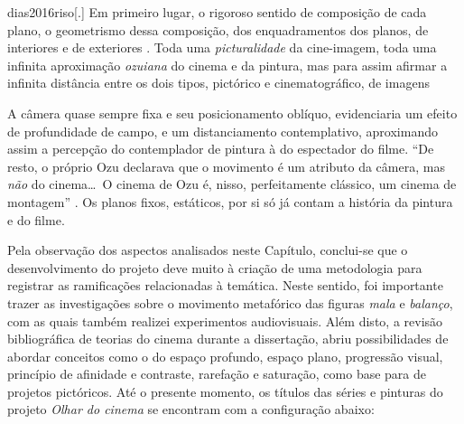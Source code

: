 \begin{displaycquote}[136-137]{dias2016riso}[.]
	Em primeiro lugar, o rigoroso sentido de composição de cada plano,
	\textelp{} o geometrismo dessa composição, dos enquadramentos dos planos,
	de interiores e de exteriores \textelp{}. Toda uma \emph{picturalidade} da
	cine-imagem, toda uma infinita aproximação \emph{ozuiana} do cinema e da
	pintura, mas para assim afirmar a infinita distância entre os dois
	tipos, pictórico e cinematográfico, de imagens
\end{displaycquote}

A câmera quase sempre fixa e seu posicionamento oblíquo, evidenciaria
um efeito de profundidade de campo, e um distanciamento contemplativo,
aproximando assim a percepção do contemplador de pintura à do
espectador do filme. \enquote{De resto, o próprio Ozu declarava que o
	movimento é um atributo da câmera, mas \emph{não} do cinema\ldots\ O
	cinema de Ozu é, nisso, perfeitamente clássico, um cinema de montagem}
\parencite[138]{dias2016riso}. Os planos fixos, estáticos, por si só já
contam a história da pintura e do filme.

Pela observação dos aspectos analisados neste Capítulo, conclui-se que
o desenvolvimento do projeto deve muito à criação de uma metodologia
para registrar as ramificações relacionadas à temática. Neste sentido,
foi importante trazer as investigações sobre o movimento metafórico das
figuras \emph{mala} e \emph{balanço}, com as quais também realizei
experimentos audiovisuais. Além disto, a revisão bibliográfica de
teorias do cinema durante a dissertação, abriu possibilidades de
abordar conceitos como o do espaço profundo, espaço plano, progressão
visual, princípio de afinidade e contraste, rarefação e saturação, como
base para de projetos pictóricos. Até o presente momento, os títulos
das séries e pinturas do projeto \emph{Olhar do cinema} se encontram
com a configuração abaixo:

